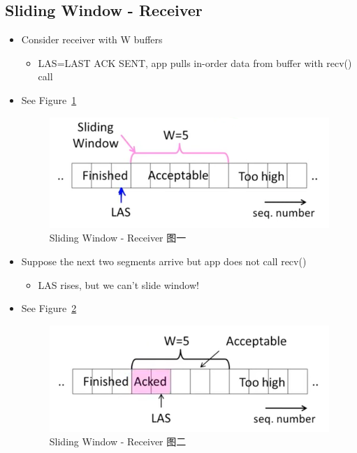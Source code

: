 \documentclass[12pt]{ctexart}   %
\begin{document}
	\subsection{Sliding Window - Receiver}
	\begin{itemize}
	 	\item Consider receiver with W buffers
	 	\begin{itemize}
	 		\item LAS=LAST ACK SENT, app pulls in-order data from buffer with recv() call
	 	\end{itemize}
	 	\item See Figure~\ref{fig:6-6-3}
		  
		 \begin{figure}[h!] %
		\centering
		 \includegraphics[scale=0.7]{images/6-6-3}
		\caption{  Sliding Window - Receiver 图一 }
		 \label{fig:6-6-3}
		 \end{figure}
		 
		 \item Suppose the next two segments arrive but app does not call recv()
		 \begin{itemize}
		 	\item LAS rises, but we can't slide window!
		 \end{itemize}
		 \item See Figure~\ref{fig:6-6-4}
		  
		 \begin{figure}[h!] %
		\centering
		 \includegraphics[scale=0.7]{images/6-6-4}
		\caption{  Sliding Window - Receiver 图二 }
		 \label{fig:6-6-4}
		 \end{figure}
		 

\end{itemize}
\end{document}
